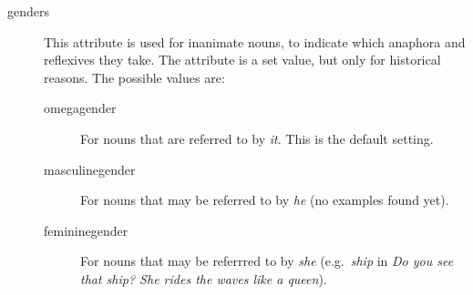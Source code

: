 \begin{description}
\item[genders] This attribute is used for inanimate nouns, to 
indicate which anaphora and reflexives they take. The attribute is a set value, 
but only for historical reasons. The possible values are:
  \begin{description}
  \item[omegagender] For nouns that are referred to by {\em it\/}. This is the default setting.
  \item[masculinegender] For nouns that may be referred to by {\em he\/} 
(no examples found yet).
  \item[femininegender] For nouns that may be referrred to by {\em she\/} 
(e.g.\ {\em ship\/} in {\em Do you see that ship? She rides the waves like a 
queen\/}).
  \end{description}


\end{description}
